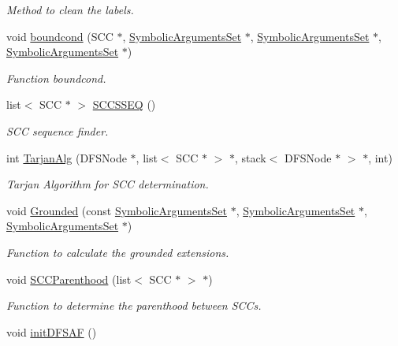 \begin{DoxyCompactItemize}
\begin{DoxyCompactList}\small\item\em Method to clean the labels. \end{DoxyCompactList}\item 
void \hyperlink{classPreferred_a2d3b394a6be2108f0f48c9b09dc36758}{boundcond} (S\-C\-C $\ast$, \hyperlink{classSymbolicArgumentsSet}{Symbolic\-Arguments\-Set} $\ast$, \hyperlink{classSymbolicArgumentsSet}{Symbolic\-Arguments\-Set} $\ast$, \hyperlink{classSymbolicArgumentsSet}{Symbolic\-Arguments\-Set} $\ast$)
\begin{DoxyCompactList}\small\item\em Function boundcond. \end{DoxyCompactList}\item 
list$<$ S\-C\-C $\ast$ $>$ \hyperlink{classPreferred_af24ffe3288d46356340d5cf45e40248e}{S\-C\-C\-S\-S\-E\-Q} ()
\begin{DoxyCompactList}\small\item\em S\-C\-C sequence finder. \end{DoxyCompactList}\item 
int \hyperlink{classPreferred_ab08f6c2c7e23bf3a0f2f643cc13513af}{Tarjan\-Alg} (D\-F\-S\-Node $\ast$, list$<$ S\-C\-C $\ast$ $>$ $\ast$, stack$<$ D\-F\-S\-Node $\ast$ $>$ $\ast$, int)
\begin{DoxyCompactList}\small\item\em Tarjan Algorithm for S\-C\-C determination. \end{DoxyCompactList}\item 
void \hyperlink{classPreferred_a5adce58891acc06715313ece50428c7c}{Grounded} (const \hyperlink{classSymbolicArgumentsSet}{Symbolic\-Arguments\-Set} $\ast$, \hyperlink{classSymbolicArgumentsSet}{Symbolic\-Arguments\-Set} $\ast$, \hyperlink{classSymbolicArgumentsSet}{Symbolic\-Arguments\-Set} $\ast$)
\begin{DoxyCompactList}\small\item\em Function to calculate the grounded extensions. \end{DoxyCompactList}\item 
void \hyperlink{classPreferred_a904892d7633a4ddbef1fb9cc84cf8a04}{S\-C\-C\-Parenthood} (list$<$ S\-C\-C $\ast$ $>$ $\ast$)
\begin{DoxyCompactList}\small\item\em Function to determine the parenthood between S\-C\-Cs. \end{DoxyCompactList}\item 
\hypertarget{classPreferred_aea3b9aa9920702ddba75d5ccc0cb320e}{void \hyperlink{classPreferred_aea3b9aa9920702ddba75d5ccc0cb320e}{init\-D\-F\-S\-A\-F} ()}\label{classPreferred_aea3b9aa9920702ddba75d5ccc0cb320e}


\end{DoxyCompactItemize}
